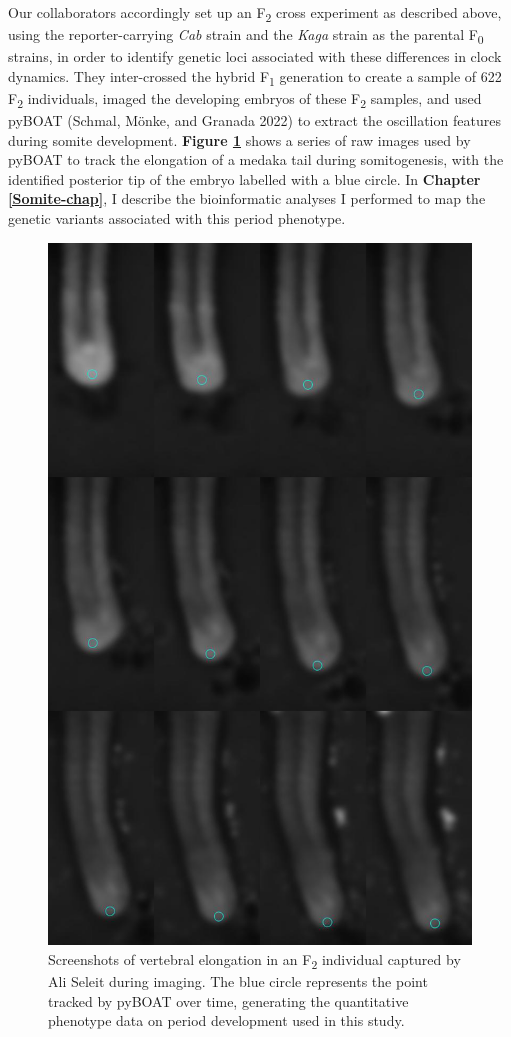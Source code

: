 \documentclass[
]{book}
\begin{document}
Our collaborators accordingly set up an F\textsubscript{2} cross experiment as described above, using the reporter-carrying \emph{Cab} strain and the \emph{Kaga} strain as the parental F\textsubscript{0} strains, in order to identify genetic loci associated with these differences in clock dynamics. They inter-crossed the hybrid F\textsubscript{1} generation to create a sample of 622 F\textsubscript{2} individuals, imaged the developing embryos of these F\textsubscript{2} samples, and used pyBOAT (Schmal, Mönke, and Granada 2022) to extract the oscillation features during somite development. \textbf{Figure \ref{fig:somite-period-ali}} shows a series of raw images used by pyBOAT to track the elongation of a medaka tail during somitogenesis, with the identified posterior tip of the embryo labelled with a blue circle. In \textbf{Chapter \ref{Somite-chap}}, I describe the bioinformatic analyses I performed to map the genetic variants associated with this period phenotype.



\begin{figure}

{\centering \includegraphics[width=0.8\linewidth]{figs/somites/ali_compiled_somite_elong} 

}

\caption{Screenshots of vertebral elongation in an F\textsubscript{2} individual captured by Ali Seleit during imaging. The blue circle represents the point tracked by pyBOAT over time, generating the quantitative phenotype data on period development used in this study.}\label{fig:somite-period-ali}
\end{figure}
\end{document}
